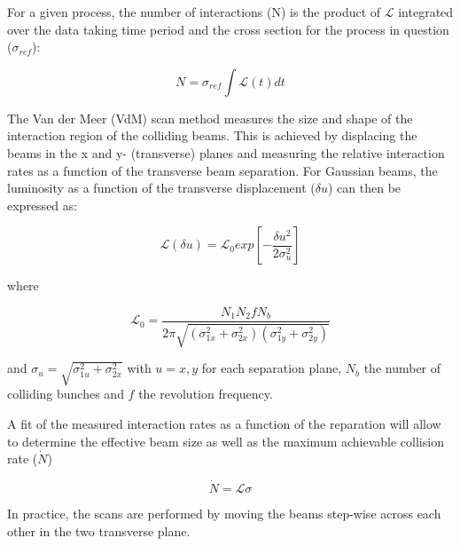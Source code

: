For a given process, the number of interactions (N) is the product of $\mathcal{L}$ integrated over the data taking time period and the cross section for the process in question ($\sigma_{ref}$):

\begin{equation}
N = \sigma_{ref}\int\mathcal{L}(t)dt
\end{equation} 


The Van der Meer (VdM) scan method measures the size and shape of the interaction region of the colliding beams. This is achieved by displacing the beams in the x and y- (transverse) planes and measuring the relative interaction rates as a function of the transverse beam separation. For Gaussian beams, the luminosity as a function of the transverse displacement ($\delta u$) can then be expressed as:  

\begin{equation}
\mathcal{L}(\delta u) = \mathcal{L}_{0} exp[-\frac{\delta u^{2}}{2\sigma_{u}^{2}}]
\end{equation}

where 

\begin{equation}
\mathcal{L}_{0} = \frac{N_{1}N_{2}fN_{b}}{2\pi\sqrt{(\sigma_{1x}^{2}+\sigma_{2x}^{2})(\sigma_{1y}^{2}+\sigma_{2y}^{2})}}
\end{equation}

and $\sigma_{u} = \sqrt{\sigma_{1u}^{2}+\sigma_{2x}^{2}}$ with $u=x,y$ for each separation plane, $N_{b}$ the number of colliding bunches and $f$ the revolution frequency.

A fit of the measured interaction rates as a function of the reparation will allow to determine the effective beam size as well as the maximum achievable collision rate ($\dot{N}$)

\begin{equation}
\dot{N} = \mathcal{L}\sigma
\end{equation}

In practice, the scans are performed by moving the beams step-wise across each other in the two transverse plane.



